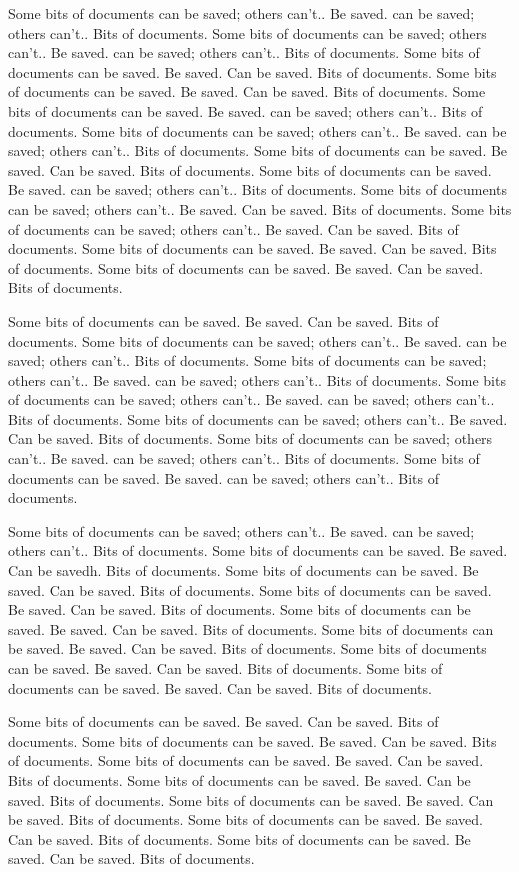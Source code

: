 \documentclass[10pt]{book}
\begin{document}
Some bits of documents can be saved; others can't..  Be saved.
can be saved; others can't..  Bits of documents.
Some bits of documents can be saved; others can't..  Be saved.
can be saved; others can't..  Bits of documents.
Some bits of documents can be saved.  Be saved.
Can be saved.  Bits of documents.
Some bits of documents can be saved.  Be saved.
Can be saved.  Bits of documents.
Some bits of documents can be saved.  Be saved.
can be saved; others can't..  Bits of documents.
Some bits of documents can be saved; others can't..  Be saved.
can be saved; others can't..  Bits of documents.
Some bits of documents can be saved.  Be saved.
Can be saved.  Bits of documents.
Some bits of documents can be saved.  Be saved.
can be saved; others can't..  Bits of documents.
Some bits of documents can be saved; others can't..  Be saved.
Can be saved.  Bits of documents.
Some bits of documents can be saved; others can't..  Be saved.
Can be saved.  Bits of documents.
Some bits of documents can be saved.  Be saved.
Can be saved.  Bits of documents.
Some bits of documents can be saved.  Be saved.
Can be saved.  Bits of documents.

Some bits of documents can be saved.  Be saved.
Can be saved.  Bits of documents.
Some bits of documents can be saved; others can't..  Be saved.
can be saved; others can't..  Bits of documents.
Some bits of documents can be saved; others can't..  Be saved.
can be saved; others can't..  Bits of documents.
Some bits of documents can be saved; others can't..  Be saved.
can be saved; others can't..  Bits of documents.
Some bits of documents can be saved; others can't..  Be saved.
Can be saved.  Bits of documents.
Some bits of documents can be saved; others can't..  Be saved.
can be saved; others can't..  Bits of documents.
Some bits of documents can be saved.  Be saved.
can be saved; others can't..  Bits of documents.

Some bits of documents can be saved; others can't..  Be saved.
can be saved; others can't..  Bits of documents.
Some bits of documents can be saved.  Be saved.
Can be savedh.  Bits of documents.
Some bits of documents can be saved.  Be saved.
Can be saved.  Bits of documents.
Some bits of documents can be saved.  Be saved.
Can be saved.  Bits of documents.
Some bits of documents can be saved.  Be saved.
Can be saved.  Bits of documents.
Some bits of documents can be saved.  Be saved.
Can be saved.  Bits of documents.
Some bits of documents can be saved.  Be saved.
Can be saved.  Bits of documents.
Some bits of documents can be saved.  Be saved.
Can be saved.  Bits of documents.

Some bits of documents can be saved.  Be saved.
Can be saved.  Bits of documents.
Some bits of documents can be saved.  Be saved.
Can be saved.  Bits of documents.
Some bits of documents can be saved.  Be saved.
Can be saved.  Bits of documents.
Some bits of documents can be saved.  Be saved.
Can be saved.  Bits of documents.
Some bits of documents can be saved.  Be saved.
Can be saved.  Bits of documents.
Some bits of documents can be saved.  Be saved.
Can be saved.  Bits of documents.
Some bits of documents can be saved.  Be saved.
Can be saved.  Bits of documents.
\end{document}
